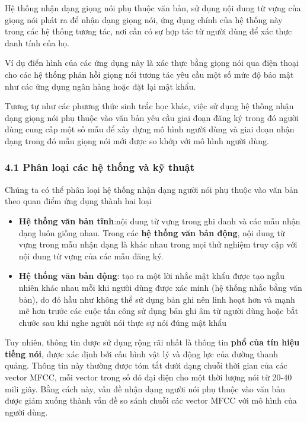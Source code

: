 \documentclass{article}
\begin{document}
	\qquad Hệ thống nhận dạng giọng nói phụ thuộc văn bản, sử dụng nội dung từ vựng của giọng nói phát ra để nhận dạng giọng nói, ứng dụng chính của hệ thống này trong các hệ thống tương tác, nơi cần có sự hợp tác từ người dùng để xác thực danh tính của họ.
	
	Ví dụ điển hình của các ứng dụng này là xác thực bằng giọng nói qua điện thoại cho các hệ thống phản hồi giọng nói tương tác yêu cầu một số mức độ bảo mật như các ứng dụng ngân hàng hoặc đặt lại mật khẩu. 
	
	Tương tự như các phương thức sinh trắc học khác, việc sử dụng hệ thống nhận dạng giọng nói phụ thuộc vào văn bản yêu cầu giai đoạn đăng ký trong đó người dùng cung cấp một số mẫu để xây dựng mô hình người dùng và giai đoạn nhận dạng trong đó mẫu giọng nói mới được so khớp với mô hình người dùng.
		
	\subsubsection{4.1 Phân loại các hệ thống và kỹ thuật}
	\qquad Chúng ta có thể phân loại hệ thống nhận dạng người nói phụ thuộc vào văn bản theo quan điểm ứng dụng thành hai loại
	\begin{itemize}
		\item \textbf{Hệ thống văn bản tĩnh}:nội dung từ vựng trong ghi danh và các mẫu nhận dạng luôn giống nhau. Trong các \textbf{hệ thống văn bản động}, nội dung từ vựng trong mẫu nhận dạng là khác nhau trong mọi thử nghiệm truy cập với nội dung từ vựng của các mẫu đăng ký.
		\item \textbf{Hệ thống văn bản động}: tạo ra một lời nhắc mật khẩu được tạo ngẫu nhiên khác nhau mỗi khi người dùng được xác minh (hệ thống nhắc bằng văn bản), do đó hầu như không thể sử dụng bản ghi nên linh hoạt hơn và mạnh mẽ hơn trước các cuộc tấn công sử dụng bản ghi âm từ người dùng hoặc bắt chước sau khi nghe người nói thực sự nói đúng mật khẩu
	\end{itemize}
		
	Tuy nhiên, thông tin được sử dụng rộng rãi nhất là thông tin \textbf{phổ của tín hiệu tiếng nói}, được xác định bởi cấu hình vật lý và động lực của đường thanh quảng. Thông tin này thường được tóm tắt dưới dạng chuỗi thời gian của các vector MFCC, mỗi vector trong số đó đại diện cho một thời lượng nói từ 20-40 mili giây. Bằng cách này, vấn đề nhận dạng người nói phụ thuộc vào văn bản được giảm xuống thành vấn đề so sánh chuỗi các vector MFCC với mô hình của người dùng. 
	
\end{document}
